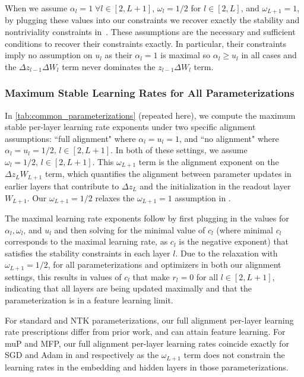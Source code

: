 \documentclass{article}
\theoremstyle{plain}
\theoremstyle{definition}
\theoremstyle{remark}
\begin{document}
When we assume $\alpha_l = 1 \;\forall l \in [2, L+1]$, $\omega_l = 1/2$ for $l \in [2, L]$, and $\omega_{L+1} = 1$, by plugging these values into our constraints we recover exactly the stability and nontriviality constraints in~\citet{yang2021tensoriv,yang2023tensorivb}. These assumptions are the necessary and sufficient conditions to recover their constraints exactly. In particular, their constraints imply no assumption on $u_l$ as their $\alpha_l = 1$ is maximal so $\alpha_l \geq u_l$ in all cases and the $\Delta z_{l-1} \Delta W_l$ term never dominates the $z_{l-1} \Delta W_l$ term.


\subsubsection{Maximum Stable Learning Rates for All Parameterizations}

In \cref{tab:common_parameterizations} (repeated here), we compute the maximum stable per-layer learning rate exponents under two specific alignment assumptions: ``full alignment" where $\alpha_l = u_l = 1$, and ``no alignment" where $\alpha_l = u_l = 1/2,\,l \in [2, L+1]$. In both of these settings, we assume $\omega_{l} = 1/2,\, l\in[2, L+1]$. This $\omega_{L+1}$ term is the alignment exponent on the $\Delta z_{L} W_{L+1}$ term, which quantifies the alignment between parameter updates in earlier layers that contribute to $\Delta z_L$ and the initialization in the readout layer $W_{L+1}$. Our $\omega_{L+1} = 1/2$ relaxes the $\omega_{L+1} = 1$ assumption in \citet{yang2021tensoriv,yang2023tensorivb}.

The maximal learning rate exponents follow by first plugging in the values for $\alpha_l, \omega_l$, and $u_l$ and then solving for the minimal value of $c_l$ (where minimal $c_l$ corresponds to the maximal learning rate, as $c_l$ is the negative exponent) that satisfies the stability constraints in each layer $l$. Due to the relaxation with $\omega_{L+1} = 1/2$, for all parameterizations and optimizers in both our alignment settings, this results in values of $c_l$ that make $r_l = 0$ for all $l \in [2,L+1]$, indicating that all layers are being updated maximally and that the parameterization is in a feature learning limit.

For standard and NTK parameterizations, our full alignment per-layer learning rate prescriptions differ from prior work, and can attain feature learning. For muP and MFP, our full alignment per-layer learning rates coincide exactly for SGD and Adam in \citet{yang2021tensoriv} and \citet{yang2023tensorivb} respectively as the $\omega_{L+1}$ term does not constrain the learning rates in the embedding and hidden layers in those parameterizations.
\end{document}
